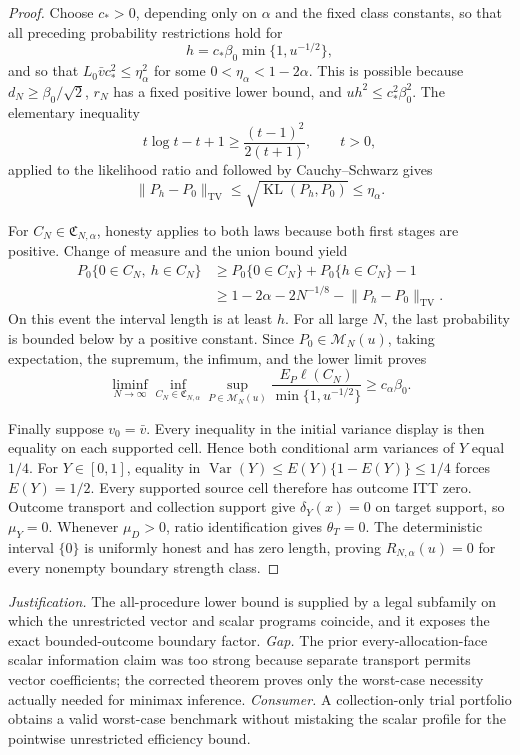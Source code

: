 \documentclass{article}
\begin{document}
\begin{proof}
Choose \(c_*>0\), depending only on \(\alpha\) and the fixed class constants, so that all preceding probability restrictions hold for
\[
h=c_*\beta_0\min\{1,u^{-1/2}\},
\]
and so that \(L_0\bar vc_*^2\le\eta_\alpha^2\) for some \(0<\eta_\alpha<1-2\alpha\). This is possible because \(d_N\ge\beta_0/\sqrt2\), \(r_N\) has a fixed positive lower bound, and \(uh^2\le c_*^2\beta_0^2\). The elementary inequality
\[
t\log t-t+1\ge\frac{(t-1)^2}{2(t+1)},\qquad t>0,
\]
applied to the likelihood ratio and followed by Cauchy--Schwarz gives
\[
\lVert P_h-P_0\rVert_{\mathrm{TV}}
\le\sqrt{\operatorname{KL}(P_h,P_0)}\le\eta_\alpha.
\]

For \(C_N\in\mathfrak C_{N,\alpha}\), honesty applies to both laws because both first stages are positive. Change of measure and the union bound yield
\[
\begin{aligned}
P_0\{0\in C_N,\ h\in C_N\}
&\ge P_0\{0\in C_N\}+P_0\{h\in C_N\}-1\\
&\ge1-2\alpha-2N^{-1/8}-\lVert P_h-P_0\rVert_{\mathrm{TV}}.
\end{aligned}
\]
On this event the interval length is at least \(h\). For all large \(N\), the last probability is bounded below by a positive constant. Since \(P_0\in\mathcal M_N(u)\), taking expectation, the supremum, the infimum, and the lower limit proves
\[
\liminf_{N\to\infty}
\inf_{C_N\in\mathfrak C_{N,\alpha}}
\sup_{P\in\mathcal M_N(u)}
\frac{E_P\ell(C_N)}{\min\{1,u^{-1/2}\}}
\ge c_\alpha\beta_0.
\]

Finally suppose \(v_0=\bar v\). Every inequality in the initial variance display is then equality on each supported cell. Hence both conditional arm variances of \(Y\) equal \(1/4\). For \(Y\in[0,1]\), equality in
\(\operatorname{Var}(Y)\le E(Y)\{1-E(Y)\}\le1/4\) forces \(E(Y)=1/2\). Every supported source cell therefore has outcome ITT zero. Outcome transport and collection support give \(\delta_Y(x)=0\) on target support, so \(\mu_Y=0\). Whenever \(\mu_D>0\), ratio identification gives \(\theta_T=0\). The deterministic interval \(\{0\}\) is uniformly honest and has zero length, proving \(R_{N,\alpha}(u)=0\) for every nonempty boundary strength class.
\end{proof}
\par\smallskip\noindent \textit{Justification.} The all-procedure lower bound is supplied by a legal subfamily on which the unrestricted vector and scalar programs coincide, and it exposes the exact bounded-outcome boundary factor. \textit{Gap.} The prior every-allocation-face scalar information claim was too strong because separate transport permits vector coefficients; the corrected theorem proves only the worst-case necessity actually needed for minimax inference. \textit{Consumer.} A collection-only trial portfolio obtains a valid worst-case benchmark without mistaking the scalar profile for the pointwise unrestricted efficiency bound.
\end{document}
